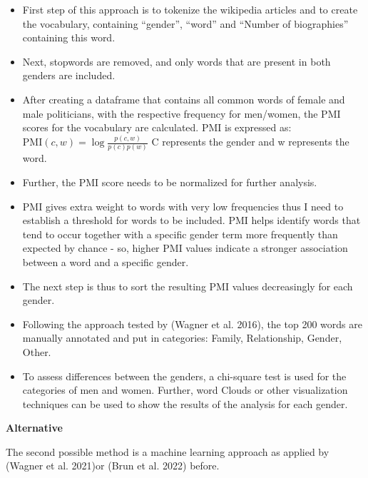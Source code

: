 \documentclass[
]{article}
\providecommand{\tightlist}{%
  \setlength{\itemsep}{0pt}\setlength{\parskip}{0pt}}
\begin{document}
\begin{itemize}
\tightlist
\item
  First step of this approach is to tokenize the wikipedia articles and
  to create the vocabulary, containing ``gender'', ``word'' and ``Number
  of biographies'' containing this word.
\item
  Next, stopwords are removed, and only words that are present in both
  genders are included.
\item
  After creating a dataframe that contains all common words of female
  and male politicians, with the respective frequency for men/women, the
  PMI scores for the vocabulary are calculated. PMI is expressed as:
  \(\text{PMI}(c, w) = \log \frac{p(c, w)}{p(c)p(w)}\) C represents the
  gender and w represents the word.
\item
  Further, the PMI score needs to be normalized for further analysis.
\item
  PMI gives extra weight to words with very low frequencies thus I need
  to establish a threshold for words to be included. PMI helps identify
  words that tend to occur together with a specific gender term more
  frequently than expected by chance - so, higher PMI values indicate a
  stronger association between a word and a specific gender.
\item
  The next step is thus to sort the resulting PMI values decreasingly
  for each gender.
\item
  Following the approach tested by (Wagner et al. 2016), the top 200
  words are manually annotated and put in categories: Family,
  Relationship, Gender, Other.
\item
  To assess differences between the genders, a chi-square test is used
  for the categories of men and women. Further, word Clouds or other
  visualization techniques can be used to show the results of the
  analysis for each gender.
\end{itemize}

\textbf{Alternative}

The second possible method is a machine learning approach as applied by
(Wagner et al. 2021)or (Brun et al. 2022) before.
\end{document}
